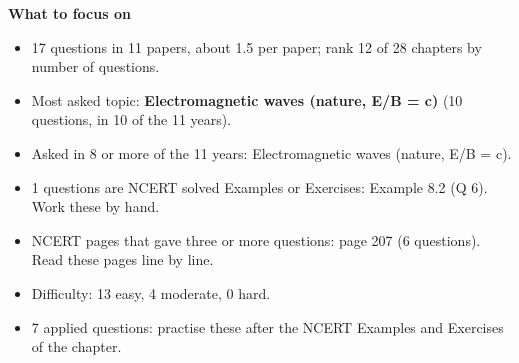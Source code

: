 \begin{minipage}[t]{0.63\linewidth}{\small\textbf{\color{crimson}What to focus on}\par\smallskip
\begin{itemize}[leftmargin=1.1em,itemsep=1pt,topsep=0pt]
\item 17 questions in 11 papers, about 1.5 per paper; rank 12 of 28 chapters by number of questions.
\item Most asked topic: \textbf{Electromagnetic waves (nature, E/B = c)} (10 questions, in 10 of the 11 years).
\item Asked in 8 or more of the 11 years: Electromagnetic waves (nature, E/B = c).
\item 1 questions are NCERT solved Examples or Exercises: Example 8.2 (Q 6). Work these by hand.
\item NCERT pages that gave three or more questions: page 207 (6 questions). Read these pages line by line.
\item Difficulty: 13 easy, 4 moderate, 0 hard.
\item 7 applied questions: practise these after the NCERT Examples and Exercises of the chapter.
\end{itemize}}\end{minipage}\par
{}
